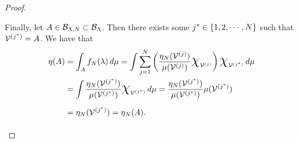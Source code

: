 \begin{proof}
\begin{itemize}
\noindent Finally, let $A\in\mathcal{B}_{{\Lambda}, N}\subset \mathcal{B}_{\Lambda}$. 
Then there exists some $j^* \in \left\{1,2, \cdots, N\right\}$ such that $\mathcal{V}^{(j^*)} = A$. 
We have that
\begin{equation*}
\begin{split}
\eta (A) &= \int_A f_N (\param) \, d\mu
=  \int \sum_{j=1}^{N} \left ( \frac{\eta_N (\VV^{(j)}) }{\mu (\VV^{(j)})} \Chi_{\VV^{(j)}}\right ) \Chi_{\VV^{(j^*)}} \, d\mu \\
&= \int \frac{\eta_N (\VV^{(j^*)}) }{\mu (\VV^{(j^*)})} \Chi_{\VV^{(j^*)}} \, d\mu
= \frac{\eta_N (\VV^{(j^*)}) }{\mu (\VV^{(j^*)})} \mu (\VV^{(j^*)}) \\
&= \eta_N (\VV^{(j^*)}) = \eta_N (A). 
\end{split}
\end{equation*}

\end{itemize}
\end{proof}


